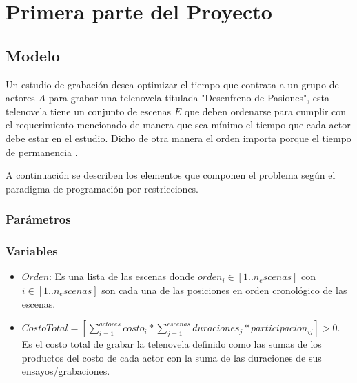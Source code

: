 \documentclass{article}
\begin{document}

\section{Primera parte del Proyecto}
\subsection{Modelo}
Un estudio de grabación desea optimizar el tiempo que contrata a un grupo de actores $A$ para grabar una telenovela titulada "Desenfreno de Pasiones", esta telenovela tiene un conjunto de escenas $E$ que deben ordenarse para cumplir con el requerimiento mencionado de manera que sea mínimo el tiempo que cada actor debe estar en el estudio. Dicho de otra manera el orden importa porque el tiempo de permanencia . \newline

A continuación se describen los elementos que componen el problema según el paradigma de programación por restricciones.

\subsubsection{Parámetros}

\subsubsection{Variables}
\begin{itemize}
    \item $Orden$: Es una lista de las escenas donde $orden_i \in [1..n_escenas]$ con $i \in [1..n_escenas]$ son cada una de las posiciones en orden cronológico de las escenas.
    \item $CostoTotal = [\sum_{i=1}^{actores} costo_i * \sum_{j=1}^{escenas}duraciones_j * participacion_{ij} ]   > 0$. \newline\newline
          Es el costo total de grabar la telenovela definido como las sumas de los productos del costo de cada actor con la suma de las duraciones de sus ensayos/grabaciones.
\end{itemize}
\end{document}
